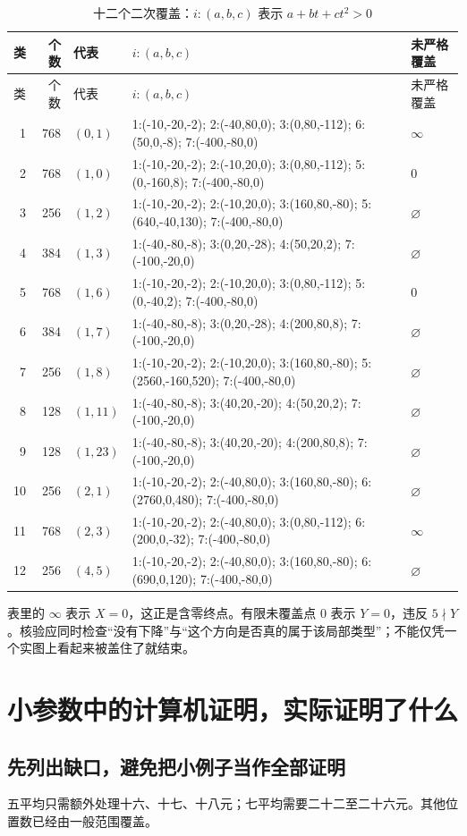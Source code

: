 \documentclass[11pt,a4paper,oneside,openany]{book}
\theoremstyle{definition}
\numberwithin{equation}{chapter}
\begin{document}
\begin{longtable}{r r l p{83mm} p{24mm}}
\caption{十二个二次覆盖：$i:(a,b,c)$ 表示 $a+bt+ct^2>0$}\label{tab:ten-data}\\
\toprule 类&个数&代表&$i:(a,b,c)$&未严格覆盖\\\midrule\endfirsthead
\toprule 类&个数&代表&$i:(a,b,c)$&未严格覆盖\\\midrule\endhead
1&768&$(0,1)$&1:(-10,-20,-2); 2:(-40,80,0); 3:(0,80,-112); 6:(50,0,-8); 7:(-400,-80,0)&$\infty$\\
2&768&$(1,0)$&1:(-10,-20,-2); 2:(-10,20,0); 3:(0,80,-112); 5:(0,-160,8); 7:(-400,-80,0)&0\\
3&256&$(1,2)$&1:(-10,-20,-2); 2:(-10,20,0); 3:(160,80,-80); 5:(640,-40,130); 7:(-400,-80,0)&$\varnothing$\\
4&384&$(1,3)$&1:(-40,-80,-8); 3:(0,20,-28); 4:(50,20,2); 7:(-100,-20,0)&$\varnothing$\\
5&768&$(1,6)$&1:(-10,-20,-2); 2:(-10,20,0); 3:(0,80,-112); 5:(0,-40,2); 7:(-400,-80,0)&0\\
6&384&$(1,7)$&1:(-40,-80,-8); 3:(0,20,-28); 4:(200,80,8); 7:(-100,-20,0)&$\varnothing$\\
7&256&$(1,8)$&1:(-10,-20,-2); 2:(-10,20,0); 3:(160,80,-80); 5:(2560,-160,520); 7:(-400,-80,0)&$\varnothing$\\
8&128&$(1,11)$&1:(-40,-80,-8); 3:(40,20,-20); 4:(50,20,2); 7:(-100,-20,0)&$\varnothing$\\
9&128&$(1,23)$&1:(-40,-80,-8); 3:(40,20,-20); 4:(200,80,8); 7:(-100,-20,0)&$\varnothing$\\
10&256&$(2,1)$&1:(-10,-20,-2); 2:(-40,80,0); 3:(160,80,-80); 6:(2760,0,480); 7:(-400,-80,0)&$\varnothing$\\
11&768&$(2,3)$&1:(-10,-20,-2); 2:(-40,80,0); 3:(0,80,-112); 6:(200,0,-32); 7:(-400,-80,0)&$\infty$\\
12&256&$(4,5)$&1:(-10,-20,-2); 2:(-40,80,0); 3:(160,80,-80); 6:(690,0,120); 7:(-400,-80,0)&$\varnothing$\\
\bottomrule\end{longtable}
\endgroup
表里的 $\infty$ 表示 $X=0$，这正是含零终点。有限未覆盖点 $0$ 表示 $Y=0$，违反 $5\nmid Y$。核验应同时检查“没有下降”与“这个方向是否真的属于该局部类型”；不能仅凭一个实图上看起来被盖住了就结束。

\chapter{小参数中的计算机证明，实际证明了什么}\label{app:small}
\section{先列出缺口，避免把小例子当作全部证明}
五平均只需额外处理十六、十七、十八元；七平均需要二十二至二十六元。其他位置数已经由一般范围覆盖。
\end{document}
